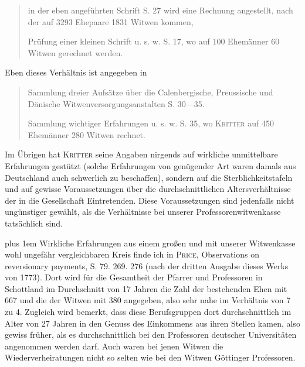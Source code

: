 \begin{quote}
in der eben angeführten Schrift S. 27 wird eine Rechnung angestellt, nach der auf 3293 Ehepaare 1831 Witwen kommen,

Prüfung einer kleinen Schrift u. s. w. S. 17, wo auf 100 Ehemänner 60 Witwen gerechnet werden.
\end{quote}
\noindent Eben dieses Verhältnis ist angegeben in
\begin{quote}
Sammlung dreier Aufsätze über die Calenbergische, Preussische und Dänische Witwenversorgungsanstalten S. 30—35.

Sammlung wichtiger Erfahrungen u. s. w. S. 35, wo \textsc{Kritter} auf 450 Ehemänner 280 Witwen rechnet.
\end{quote}
\noindent\hspace*{\parindent}Im Übrigen hat \textsc{Kritter} seine Angaben nirgends auf wirkliche unmittelbare Erfahrungen gestützt (solche Erfahrungen von genügender Art waren damals aus Deutschland auch schwerlich zu beschaffen), sondern auf die Sterblichkeitstafeln und auf gewisse Voraussetzungen über die durchschnittlichen Altersverhältnisse der in die Gesellschaft Eintretenden. Diese Voraussetzungen sind jedenfalls nicht ungünstiger gewählt, als die Verhältnisse bei unserer Professorenwitwenkasse tatsächlich sind.

{\rightskip=0pt plus 1em
Wirkliche Erfahrungen aus einem großen und mit unserer Witwenkasse wohl ungefähr vergleichbaren Kreis finde ich in \textsc{Price}, Observations on reversionary payments, S. 79. 269. 276 (nach der dritten Ausgabe dieses Werks von 1773). Dort wird für die Gesamtheit der Pfarrer und Professoren in Schottland im Durchschnitt von 17 Jahren die Zahl der bestehenden Ehen mit 667 und die der Witwen mit 380 angegeben, also sehr nahe im Verhältnis von 7 zu 4. Zugleich wird bemerkt, dass diese Berufsgruppen dort durchschnittlich im Alter von 27 Jahren in den Genuss des Einkommens aus ihren Stellen kamen, also gewiss früher, als es durchschnittlich bei den Professoren deutscher Universitäten angenommen werden darf. Auch waren bei jenen Witwen die Wiederverheiratungen nicht so selten wie bei den Witwen Göttinger Professoren.\par}


